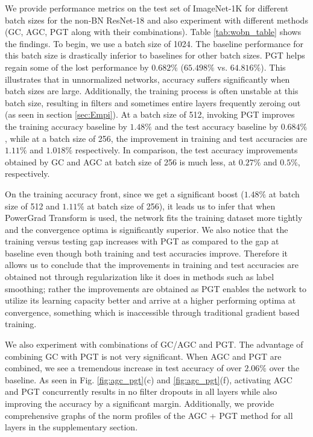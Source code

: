 \documentclass[times,sort&compress]{elsarticle}
\begin{document}
We provide performance metrics on the test set of ImageNet-1K for different batch sizes
for the non-BN ResNet-18 and also experiment with different methods (GC, AGC, PGT along
with their combinations). Table \ref{tab:wobn_table} shows the findings. To begin, we
use a batch size of 1024. The baseline performance for this batch size is drastically
inferior to baselines for other batch sizes. PGT helps regain some of the lost
performance by $0.682\%$ ($65.498\%$ vs. $64.816\%$). This illustrates that in
unnormalized networks, accuracy suffers significantly when batch sizes are large.
Additionally, the training process is often unstable at this batch size, resulting in
filters and sometimes entire layers frequently zeroing out (as seen in section
\ref{sec:Empi}). At a batch size of 512, invoking PGT improves the training accuracy
baseline by $1.48\%$ and the test accuracy baseline by $0.684\%$, while at a batch size
of 256, the improvement in training and test accuracies are $1.11\%$ and $1.018\%$
respectively. In comparison, the test accuracy improvements obtained by GC and AGC at
batch size of 256 is much less, at $0.27\%$ and $0.5\%$, respectively.

On the training accuracy front, since we get a significant boost ($1.48\%$ at batch size
of 512 and $1.11\%$ at batch size of 256), it leads us to infer that when PowerGrad
Transform is used, the network fits the training dataset more tightly and the
convergence optima is significantly superior. We also notice that the training versus
testing gap increases with PGT as compared to the gap at baseline even though both
training and test accuracies improve. Therefore it allows us to conclude that the
improvements in training and test accuracies are obtained not through regularization
like it does in methods such as label smoothing; rather the improvements are obtained as
PGT enables the network to utilize its learning capacity better and arrive at a higher
performing optima at convergence, something which is inaccessible through traditional
gradient based training.

We also experiment with combinations of GC/AGC and PGT. The advantage of combining GC
with PGT is not very significant. When AGC and PGT are combined, we see a tremendous
increase in test accuracy of over $2.06\%$ over the baseline. As seen in Fig.
\ref{fig:agc_pgt}(c) and \ref{fig:agc_pgt}(f), activating AGC and PGT concurrently
results in no filter dropouts in all layers while also improving the accuracy by a
significant margin. Additionally, we provide comprehensive graphs of the norm profiles
of the AGC + PGT method for all layers in the supplementary section.
\end{document}
